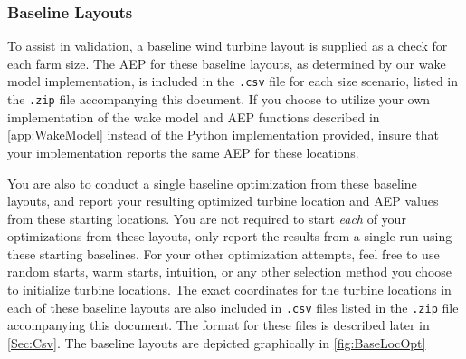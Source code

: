 \documentclass[12pt]{article}
\begin{document}
\subsubsection{Baseline Layouts}\label{Sec:Baseline}
To assist in validation, a baseline wind turbine layout is supplied as a check for each farm size. The AEP for these baseline layouts, as determined by our wake model implementation, is included in the \texttt{.csv} file for each size scenario, listed in the \texttt{.zip} file accompanying this document. If you choose to utilize your own implementation of the wake model and AEP functions described in \cref{app:WakeModel} instead of the Python implementation provided, insure that your implementation reports the same AEP for these locations.

You are also to conduct a single baseline optimization from these baseline layouts, and report your resulting optimized turbine location and AEP values from these starting locations. You are not required to start \textit{each} of your optimizations from these layouts, only report the results from a single run using these starting baselines. For your other optimization attempts, feel free to use random starts, warm starts, intuition, or any other selection method you choose to initialize turbine locations. The exact coordinates for the turbine locations in each of these baseline layouts are also included in \texttt{.csv} files listed in the \texttt{.zip} file accompanying this document. The format for these files is described later in \cref{Sec:Csv}. The baseline layouts are depicted graphically in \cref{fig:BaseLocOpt}
\end{document}
